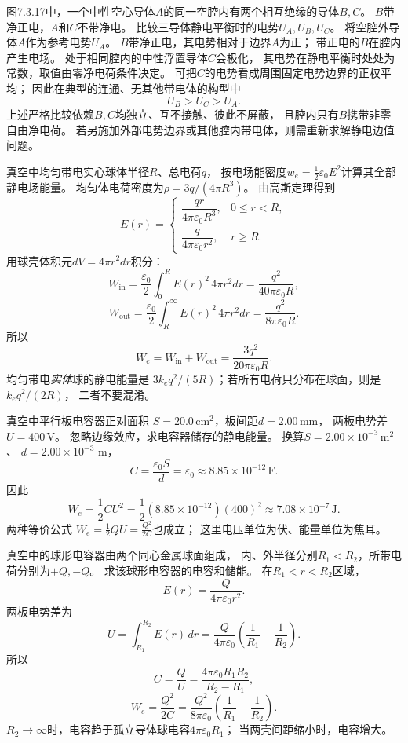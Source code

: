 \problemtext 图7.3.17中，一个中性空心导体$A$的同一空腔内有两个相互绝缘的导体$B,C$。
$B$带净正电，$A$和$C$不带净电。
比较三导体静电平衡时的电势$U_A,U_B,U_C$。
\workings
将空腔外导体$A$作为参考电势$U_A$。
$B$带净正电，其电势相对于边界$A$为正；
带正电的$B$在腔内产生电场。
处于相同腔内的中性浮置导体$C$会极化，
其电势在静电平衡时处处为常数，取值由零净电荷条件决定。
可把$C$的电势看成周围固定电势边界的正权平均；
因此在典型的连通、无其他带电体的构型中
\[
\boxed{U_B>U_C>U_A}.
\]
\crosscheck 上述严格比较依赖$B,C$均独立、互不接触、彼此不屏蔽，
且腔内只有$B$携带非零自由净电荷。
若另施加外部电势边界或其他腔内带电体，则需重新求解静电边值问题。

\problemtext 真空中均匀带电实心球体半径$R$、总电荷$q$，
按电场能密度$w_e=\tfrac12\varepsilon_0E^2$计算其全部静电场能量。
\workings
均匀体电荷密度为$\rho=3q/(4\pi R^3)$。
由高斯定理得到
\[
E(r)=
\begin{cases}
\dfrac{qr}{4\pi\varepsilon_0R^3},&0\le r<R,\\
\dfrac{q}{4\pi\varepsilon_0r^2},&r\ge R.
\end{cases}
\]
用球壳体积元$dV=4\pi r^2dr$积分：
\[
W_{\mathrm{in}}=\frac{\varepsilon_0}{2}
\int_0^R E(r)^2\,4\pi r^2dr
=\frac{q^2}{40\pi\varepsilon_0R},
\]
\[
W_{\mathrm{out}}=\frac{\varepsilon_0}{2}
\int_R^\infty E(r)^2\,4\pi r^2dr
=\frac{q^2}{8\pi\varepsilon_0R}.
\]
所以
\[
\boxed{W_e=W_{\mathrm{in}}+W_{\mathrm{out}}
=\frac{3q^2}{20\pi\varepsilon_0R}}.
\]
\crosscheck 均匀带电\emph{实体}球的静电能量是
$3k_eq^2/(5R)$；若所有电荷只分布在球面，则是$k_eq^2/(2R)$，
二者不要混淆。

\problemtext 真空中平行板电容器正对面积
$S=20.0\,\mathrm{cm^2}$，板间距$d=2.00\,\mathrm{mm}$，
两板电势差$U=400\,\mathrm V$。
忽略边缘效应，求电容器储存的静电能量。
\workings
换算$S=2.00\times10^{-3}\,\mathrm{m^2}$、
$d=2.00\times10^{-3}$ m，
\[
C=\frac{\varepsilon_0S}{d}
=\varepsilon_0\approx8.85\times10^{-12}\,\mathrm F.
\]
因此
\[
\boxed{W_e=\frac12CU^2
=\frac12(8.85\times10^{-12})(400)^2
\approx7.08\times10^{-7}\,\mathrm J}.
\]
\crosscheck 两种等价公式
$W_e=\tfrac12 QU=\tfrac{Q^2}{2C}$也成立；
这里电压单位为伏、能量单位为焦耳。

\problemtext 真空中的球形电容器由两个同心金属球面组成，
内、外半径分别$R_1<R_2$，所带电荷分别为$+Q,-Q$。
求该球形电容器的电容和储能。
\workings
在$R_1<r<R_2$区域，
\[
E(r)=\frac{Q}{4\pi\varepsilon_0r^2}.
\]
两板电势差为
\[
U=\int_{R_1}^{R_2}E(r)\,dr
=\frac{Q}{4\pi\varepsilon_0}
\left(\frac1{R_1}-\frac1{R_2}\right).
\]
所以
\[
\boxed{C=\frac Q U
=\frac{4\pi\varepsilon_0R_1R_2}{R_2-R_1}},
\]
\[
\boxed{W_e=\frac{Q^2}{2C}
=\frac{Q^2}{8\pi\varepsilon_0}
\left(\frac1{R_1}-\frac1{R_2}\right)}.
\]
\crosscheck $R_2\to\infty$时，电容趋于孤立导体球电容$4\pi\varepsilon_0R_1$；
当两壳间距缩小时，电容增大。
